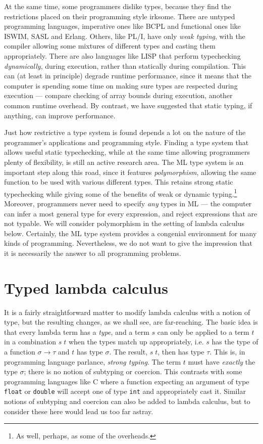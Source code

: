 At the same time, some programmers dislike types, because they find the
restrictions placed on their programming style irksome. There are untyped
programming languages, imperative ones like BCPL and functional ones like
ISWIM, SASL and Erlang. Others, like PL/I, have only {\em weak typing}, with
the compiler allowing some mixtures of different types and casting them
appropriately. There are also languages like LISP that perform typechecking
{\em dynamically}, during execution, rather than statically during compilation.
This can (at least in principle) degrade runtime performance, since it means
that the computer is spending some time on making sure types are respected
during execution --- compare checking of array bounds during execution, another
common runtime overhead. By contrast, we have suggested that static typing, if
anything, can improve performance.

Just how restrictive a type system is found depends a lot on the nature of the
programmer's applications and programming style. Finding a type system that
allows useful static typechecking, while at the same time allowing programmers
plenty of flexibility, is still an active research area. The ML type system is
an important step along this road, since it features {\em polymorphism},
allowing the same function to be used with various different types. This
retains strong static typechecking while giving some of the benefits of weak or
dynamic typing.\footnote{As well, perhaps, as some of the overheads.} Moreover,
programmers never need to specify {\em any} types in ML --- the computer can
infer a most general type for every expression, and reject expressions that are
not typable. We will consider polymorphism in the setting of lambda calculus
below. Certainly, the ML type system provides a congenial environment for many
kinds of programming. Nevertheless, we do not want to give the impression that
it is necessarily the answer to all programming problems.

\section{Typed lambda calculus}

It is a fairly straightforward matter to modify lambda calculus with a notion
of type, but the resulting changes, as we shall see, are far-reaching. The
basic idea is that every lambda term has a {\em type}, and a term $s$ can only
be applied to a term $t$ in a combination $s\; t$ when the types match up
appropriately, i.e. $s$ has the type of a function $\sigma \to \tau$ and $t$
has type $\sigma$. The result, $s\; t$, then has type $\tau$. This is, in
programming language parlance, {\em strong typing}. The term $t$ must have {\em
exactly} the type $\sigma$; there is no notion of subtyping or coercion. This
contrasts with some programming languages like C where a function expecting an
argument of type {\tt float} or {\tt double} will accept one of type {\tt int}
and appropriately cast it. Similar notions of subtyping and coercion can also
be added to lambda calculus, but to consider these here would lead us too far
astray.

